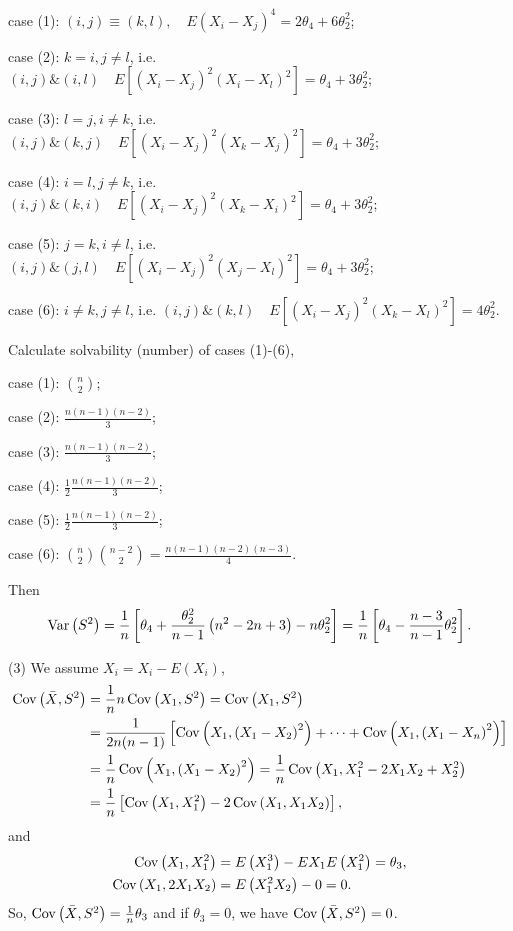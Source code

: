 case (1): $(i,j)\equiv(k,l),\quad E\left(X_{i}-X_{j}\right)^{4}=2\theta_{4}+6\theta_{2}^{2}$;

case (2): $k=i,j\neq l$, i.e. $(i,j)\&(i,l)\quad E\left[\left(X_{i}-X_{j}\right)^{2}\left(X_{i}-X_{l}\right)^{2}\right]=\theta_{4}+3\theta_{2}^{2}$;

case (3): $l=j,i\neq k$, i.e. $(i,j)\&(k,j)\quad E\left[\left(X_{i}-X_{j}\right)^{2}\left(X_{k}-X_{j}\right)^{2}\right]=\theta_{4}+3\theta_{2}^{2}$;

case (4): $i=l,j\neq k$, i.e. $(i,j)\&(k,i)\quad E\left[\left(X_{i}-X_{j}\right)^{2}\left(X_{k}-X_{i}\right)^{2}\right]=\theta_{4}+3\theta_{2}^{2}$;

case (5): $j=k,i\neq l$, i.e. $(i,j)\&(j,l)\quad E\left[\left(X_{i}-X_{j}\right)^{2}\left(X_{j}-X_{l}\right)^{2}\right]=\theta_{4}+3\theta_{2}^{2}$;

case (6): $i\neq k,j\neq l$, i.e. $(i,j)\&(k,l)\quad E\left[\left(X_{i}-X_{j}\right)^{2}\left(X_{k}-X_{l}\right)^{2}\right]=4\theta_{2}^{2}$.

Calculate solvability (number) of cases (1)-(6),

case (1): $\binom{n}{2}$;

case (2): $\frac{n(n-1)(n-2)}{3}$;

case (3): $\frac{n(n-1)(n-2)}{3}$;

case (4): $\frac{1}{2}\frac{n(n-1)(n-2)}{3}$;

case (5): $\frac{1}{2}\frac{n(n-1)(n-2)}{3}$;

case (6): $\binom{n}{2}\binom{n-2}{2}=\frac{n(n-1)(n-2)(n-3)}{4}$.

Then
\[
\operatorname{Var}\left(S^{2}\right)=\frac{1}{n}\left[\theta_{4}+\frac{\theta_{2}^{2}}{n-1}\left(n^{2}-2n+3\right)-n\theta_{2}^{2}\right]=\frac{1}{n}\left[\theta_{4}-\frac{n-3}{n-1}\theta_{2}^{2}\right].
\]

(3) We assume $X_{i}=X_{i}-E\left(X_{i}\right)$,
\begin{align*}
\operatorname{Cov}\left(\bar{X},S^{2}\right)&=\frac{1}{n}n\operatorname{Cov}\left(X_{1},S^{2}\right)=\operatorname{Cov}\left(X_{1},S^{2}\right)\\
&=\frac{1}{2n(n-1)}\left[\operatorname{Cov}\left(X_{1},\left(X_{1}-X_{2}\right)^{2}\right)+\cdots+\operatorname{Cov}\left(X_{1},\left(X_{1}-X_{n}\right)^{2}\right)\right]\\
&=\frac{1}{n}\operatorname{Cov}\left(X_{1},\left(X_{1}-X_{2}\right)^{2}\right)=\frac{1}{n}\operatorname{Cov}\left(X_{1},X_{1}^{2}-2X_{1}X_{2}+X_{2}^{2}\right)\\
&=\frac{1}{n}\left[\operatorname{Cov}\left(X_{1},X_{1}^{2}\right)-2\operatorname{Cov}\left(X_{1},X_{1}X_{2}\right)\right],
\end{align*}
and
\begin{align*}
\operatorname{Cov}\left(X_{1},X_{1}^{2}\right)&=E\left(X_{1}^{3}\right)-EX_{1}E\left(X_{1}^{2}\right)=\theta_{3},\\
\operatorname{Cov}\left(X_{1},2X_{1}X_{2}\right)&=E\left(X_{1}^{2}X_{2}\right)-0=0.\end{align*}
So, $\operatorname{Cov}\left(\bar{X},S^{2}\right)=\frac{1}{n}\theta_{3}$ and if $\theta_{3}=0$, we have $\operatorname{Cov}\left(\bar{X},S^{2}\right)=0$.

